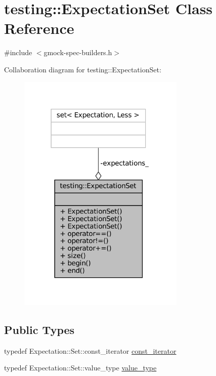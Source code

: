 \hypertarget{classtesting_1_1ExpectationSet}{}\section{testing\+:\+:Expectation\+Set Class Reference}
\label{classtesting_1_1ExpectationSet}


{\ttfamily \#include $<$gmock-\/spec-\/builders.\+h$>$}



Collaboration diagram for testing\+:\+:Expectation\+Set\+:
\nopagebreak
\begin{figure}[H]
\begin{center}
\leavevmode
\includegraphics[width=226pt]{classtesting_1_1ExpectationSet__coll__graph}
\end{center}
\end{figure}
\subsection*{Public Types}
\begin{DoxyCompactItemize}
\item 
typedef Expectation\+::\+Set\+::const\+\_\+iterator \hyperlink{classtesting_1_1ExpectationSet_ab269a45f80d8c4f747b29de454a084bb}{const\+\_\+iterator}
\item 
typedef Expectation\+::\+Set\+::value\+\_\+type \hyperlink{classtesting_1_1ExpectationSet_aab6d2d4800cec231bcedae33deaca7f6}{value\+\_\+type}
\end{DoxyCompactItemize}
